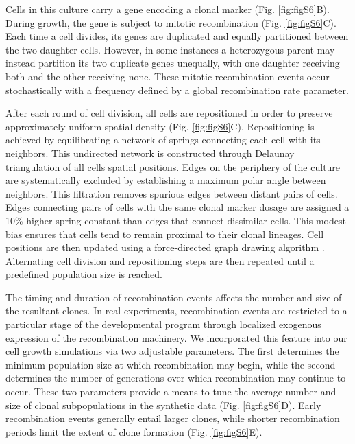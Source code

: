 Cells in this culture carry a gene encoding a clonal marker (Fig. \ref{fig:figS6}B). During growth, the gene is subject to mitotic recombination (Fig. \ref{fig:figS6}C). Each time a cell divides, its genes are duplicated and equally partitioned between the two daughter cells. However, in some instances a heterozygous parent may instead partition its two duplicate genes unequally, with one daughter receiving both and the other receiving none. These mitotic recombination events occur stochastically with a frequency defined by a global recombination rate parameter. 

After each round of cell division, all cells are repositioned in order to preserve approximately uniform spatial density (Fig. \ref{fig:figS6}C). Repositioning is achieved by equilibrating a network of springs connecting each cell with its neighbors. This undirected network is constructed through Delaunay triangulation of all cells spatial positions. Edges on the periphery of the culture are systematically excluded by establishing a maximum polar angle between neighbors. This filtration removes spurious edges between distant pairs of cells. Edges connecting pairs of cells with the same clonal marker dosage are assigned a 10\% higher spring constant than edges that connect dissimilar cells. This modest bias ensures that cells tend to remain proximal to their clonal lineages. Cell positions are then updated using a force-directed graph drawing algorithm \cite{Kamada1989}. Alternating cell division and repositioning steps are then repeated until a predefined population size is reached. 

The timing and duration of recombination events affects the number and size of the resultant clones. In real experiments, recombination events are restricted to a particular stage of the developmental program through localized exogenous expression of the recombination machinery. We incorporated this feature into our cell growth simulations via two adjustable parameters. The first determines the minimum population size at which recombination may begin, while the second determines the number of generations over which recombination may continue to occur. These two parameters provide a means to tune the average number and size of clonal subpopulations in the synthetic data (Fig. \ref{fig:figS6}D). Early recombination events generally entail larger clones, while shorter recombination periods limit the extent of clone formation (Fig. \ref{fig:figS6}E).


